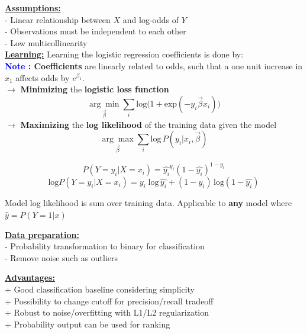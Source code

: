 \documentclass[letterpaper, 10.5pt,landscape]{article}
\begin{document}
\begin{multicols*}{3}
\vspace{2pt}
\textbf{\underline{Assumptions:}} \\
- Linear relationship between $X$ and log-odds of $Y$ \\
- Observations must be independent to each other \\
- Low multicollinearity \\

\vspace{2pt}
\textbf{\underline{Learning:}} Learning the logistic regression coefficients is done by: \\
\textbf{\textcolor{blue}{Note :} Coefficients} are linearly related to odds, such that a one unit increase in $x_{1}$ affects odds by $e^{\beta_{1}}$. \\
$\rightarrow$ \textbf{Minimizing} the \textbf{logistic loss function} 
\vspace{-5pt}
\[\boxed{\underset{\vec{\beta}} {\arg\min} \sum_{i} \text{log}\big(1+\text{exp}(-y_{i} \vec{\beta}x_{i}) \big)} \] 
$\rightarrow$ \textbf{Maximizing} the \textbf{log likelihood} of the training data given the model 
\vspace{-5pt}
\[\boxed{\underset{\vec{\beta}} {\arg\max} \sum_{i} \text{log} \hspace{2pt} P\left(y_{i} | x_{i}, \vec{\beta} \right)} \]

\[P \left(Y=y_{i} | X=x_{i} \right) = \hat{y_{i}}^{y_{i}} \left(1- \hat{y_{i}}\right)^{1-y_{i}}  \]
\vspace{-10pt}
\[\text{log} P \left(Y=y_{i} | X=x_{i} \right) = y_{i} \; \text{log}\,  \hat{y_{i}} +  (1-y_{i}) \, \text{log}\left(1- \hat{y_{i}}\right)  \]

Model log likelihood is sum over training data. Applicable to \textbf{any} model where \(\hat{y} = P(Y=1 |x) \) 


\vspace{2pt}
\textbf{\underline{Data preparation:}}\\
- Probability transformation to binary for classification \\
- Remove noise such as outliers

\vspace{2pt}
\textbf{\underline{Advantages:}} \\
+ Good classification baseline considering simplicity \\
+ Possibility to change cutoff for precision/recall tradeoff \\
+ Robust to noise/overfitting with L1/L2 regularization \\
+ Probability output can be used for ranking  


\end{multicols*}
\end{document}
